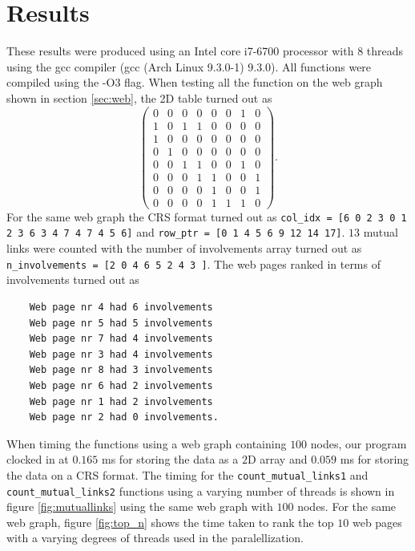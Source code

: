 \documentclass[onecolumn]{aastex62}
\begin{document}
\section{Results}\label{sec:results}
These results were produced using an Intel core i7-6700 processor with 8 threads using the gcc compiler (gcc (Arch Linux 9.3.0-1) 9.3.0). All functions were compiled using the -O3 flag. When testing all the function on the web graph shown in section \ref{sec:web}, the 2D table turned out as 
\begin{equation*}
    \begin{pmatrix}
     0& 0 & 0& 0& 0& 0& 1& 0 \\
     1& 0 & 1& 1& 0& 0& 0& 0 \\
     1& 0 & 0& 0& 0& 0& 0& 0 \\
     0& 1 & 0& 0& 0& 0& 0& 0 \\
     0& 0 & 1& 1& 0& 0& 1& 0 \\
     0& 0 & 0& 1& 1& 0& 0& 1 \\
     0& 0 & 0& 0& 1& 0& 0& 1 \\
     0& 0 & 0& 0& 1& 1& 1& 0
    \end{pmatrix}.
\end{equation*}
For the same web graph the CRS format turned out as \texttt{col\_idx = [6 0 2 3 0 1 2 3 6 3 4 7 4 7 4 5 6]} and \texttt{row\_ptr  = [0 1 4 5 6 9 12 14 17]}. $13$ mutual links were counted with the number of involvements array turned out as \texttt{n\_involvements = [2 0 4 6 5 2 4 3 
]}. The web pages ranked in terms of involvements turned out as 
\begin{lstlisting}
    Web page nr 4 had 6 involvements
    Web page nr 5 had 5 involvements
    Web page nr 7 had 4 involvements
    Web page nr 3 had 4 involvements
    Web page nr 8 had 3 involvements
    Web page nr 6 had 2 involvements
    Web page nr 1 had 2 involvements
    Web page nr 2 had 0 involvements.
\end{lstlisting}
When timing the functions using a web graph containing $100$ nodes, our program clocked in at $0.165$ ms for storing the data as a $2$D array and $0.059$ ms for storing the data on a CRS format. The timing for the \texttt{count\_mutual\_links1} and \texttt{count\_mutual\_links2} functions using a varying number of threads is shown in figure \ref{fig:mutuallinks} using the same web graph with $100$ nodes. For the same web graph, figure \ref{fig:top_n} shows the time taken to rank the top $10$ web pages with a varying degrees of threads used in the paralellization. 
\end{document}
